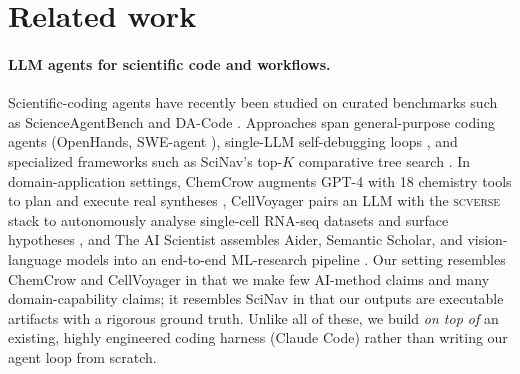 \documentclass{article}
\begin{document}
\section{Related work}
\label{sec:related}

\paragraph{LLM agents for scientific code and workflows.}
Scientific-coding agents have recently been studied on curated benchmarks such as ScienceAgentBench and DA-Code \cite{chen2025scienceagentbench,huang2024dacode}. Approaches span general-purpose coding agents (OpenHands, SWE-agent \cite{wang2024openhands,yang2024sweagent}), single-LLM self-debugging loops \cite{chen2024selfdebug}, and specialized frameworks such as SciNav's top-$K$ comparative tree search \cite{zhang2026scinav}. In domain-application settings, ChemCrow augments GPT-4 with 18 chemistry tools to plan and execute real syntheses \cite{bran2024chemcrow}, CellVoyager pairs an LLM with the \textsc{scverse} stack to autonomously analyse single-cell RNA-seq datasets and surface hypotheses \cite{alber2025cellvoyager}, and The AI Scientist assembles Aider, Semantic Scholar, and vision-language models into an end-to-end ML-research pipeline \cite{lu2024aiscientist}. Our setting resembles ChemCrow and CellVoyager in that we make few AI-method claims and many domain-capability claims; it resembles SciNav in that our outputs are executable artifacts with a rigorous ground truth. Unlike all of these, we build \emph{on top of} an existing, highly engineered coding harness (Claude Code) rather than writing our agent loop from scratch.

\end{document}
